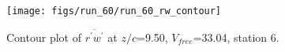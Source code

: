 \begin{figure}[H]
\centering
\texttt{[image: figs/run\_60/run\_60\_rw\_contour]}
\caption{Contour plot of $\overline{r^\prime w^\prime}$ at $z/c$=9.50, $V_{free}$=33.04, station 6.}
\end{figure}


